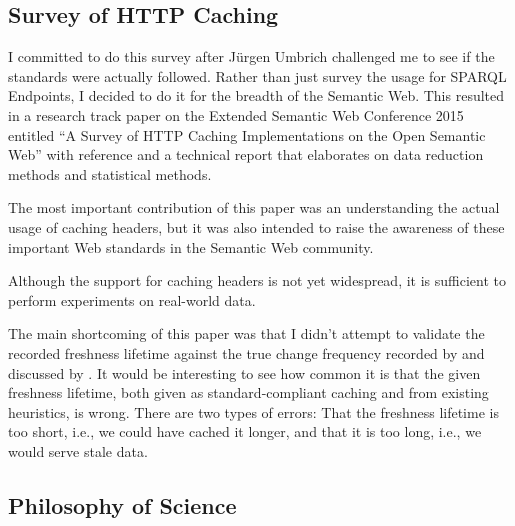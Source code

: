 \subsection{Survey of HTTP Caching}\label{sec:consanity}

I committed to do this survey after Jürgen Umbrich challenged me to see
if the standards were actually followed. Rather than just survey the
usage for SPARQL Endpoints, I decided to do it for the breadth of the
Semantic Web. This resulted in a research track paper on the Extended
Semantic Web Conference 2015 entitled ``A Survey of HTTP Caching
Implementations on the Open Semantic Web'' with reference
\cite{kjernsmo_survey_2015} and a technical report
\cite{kjernsmo_add_survey_2015} that elaborates on data reduction
methods and statistical methods.

The most important contribution of this paper was an understanding the
actual usage of caching headers, but it was also intended to raise the
awareness of these important Web standards in the Semantic Web community.

Although the support for caching headers is not yet widespread, it is
sufficient to perform experiments on real-world data.

The main shortcoming of this paper was that I didn't attempt to
validate the recorded freshness lifetime against the true change
frequency recorded by \cite{dyldo2} and discussed by
\cite{Dividino2015}. It would be interesting to see how common it is
that the given freshness lifetime, both given as standard-compliant
caching and from existing heuristics, is wrong. There are two types of
errors: That the freshness lifetime is too short, i.e., we could have
cached it longer, and that it is too long, i.e., we would serve stale
data.

\subsection{Philosophy of Science}\label{sec:conphil}

